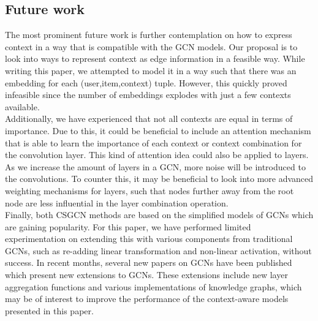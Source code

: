 \subsection{Future work}
The most prominent future work is further contemplation on how to express context in a way that is compatible with the GCN models.
Our proposal is to look into ways to represent context as edge information in a feasible way.
While writing this paper, we attempted to model it in a way such that there was an embedding for each (user,item,context) tuple.
However, this quickly proved infeasible since the number of embeddings explodes with just a few contexts available.
\\
Additionally, we have experienced that not all contexts are equal in terms of importance.
Due to this, it could be beneficial to include an attention mechanism that is able to learn the importance of each context or context combination for the convolution layer.
This kind of attention idea could also be applied to layers.
As we increase the amount of layers in a GCN, more noise will be introduced to the convolutions.
To counter this, it may be beneficial to look into more advanced weighting mechanisms for layers, such that nodes further away from the root node are less influential in the layer combination operation.
\\
Finally, both CSGCN methods are based on the simplified models of GCNs which are gaining popularity.
For this paper, we have performed limited experimentation on extending this with various components from traditional GCNs, such as re-adding linear transformation and non-linear activation, without success.
In recent months, several new papers on GCNs have been published which present new extensions to GCNs.
These extensions include new layer aggregation functions and various implementations of knowledge graphs, which may be of interest to improve the performance of the context-aware models presented in this paper.
